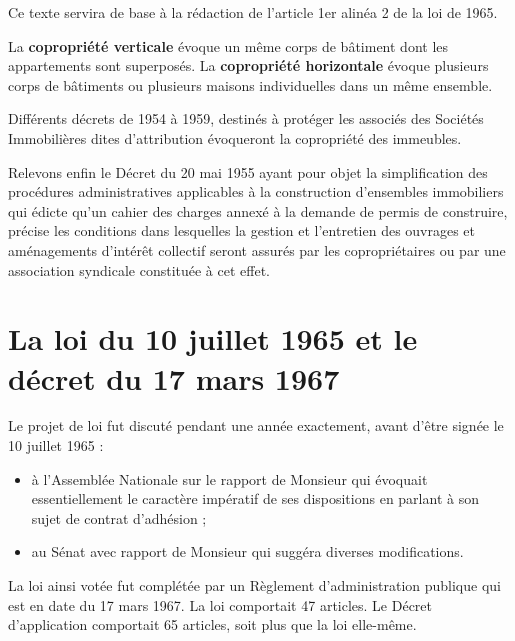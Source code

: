 		Ce texte servira de base à la rédaction de l'article 1er alinéa 2 de la loi de 1965.
		
		La \textbf{copropriété verticale} évoque un même corps de bâtiment dont les appartements sont superposés.
		La \textbf{copropriété horizontale} évoque plusieurs corps de bâtiments ou plusieurs maisons individuelles dans un même ensemble.
		
		Différents décrets de 1954 à 1959, destinés à protéger les associés des Sociétés Immobilières dites d'attribution évoqueront la copropriété des immeubles.
		
		Relevons enfin le Décret du 20 mai 1955 ayant pour objet la simplification des procédures administratives applicables à la construction d'ensembles immobiliers qui édicte qu'un cahier des charges annexé à la demande de permis de construire, précise les conditions dans lesquelles la gestion et l'entretien des ouvrages et aménagements d'intérêt collectif seront assurés par les copropriétaires ou par une association syndicale constituée à cet effet.

\section{La loi du 10 juillet 1965 et le décret du 17 mars 1967}
	Le projet de loi fut discuté pendant une année exactement, avant d’être signée le 10 juillet 1965 :
	\begin{itemize}
		\item 	à l'Assemblée Nationale sur le rapport de Monsieur  qui évoquait essentiellement le caractère impératif de ses dispositions en parlant à son sujet de contrat d'adhésion ;
		\item  au Sénat avec rapport de Monsieur  qui suggéra diverses modifications.
	\end{itemize}
	La loi ainsi votée fut complétée par un Règlement d'administration publique qui est en date du 17 mars 1967. La loi comportait 47 articles. Le Décret d'application comportait 65 articles, soit plus que la loi elle-même.

